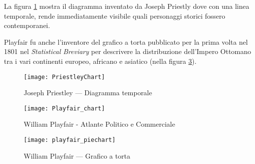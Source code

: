 La figura \ref{fig:diagramma_temporale} mostra il diagramma inventato da Joseph Priestly dove con una linea temporale, rende immediatamente visibile quali personaggi storici fossero contemporanei.

Playfair fu anche l’inventore del grafico a torta pubblicato per la prima volta nel 1801 nel \emph{Statistical Breviary} per descrivere la distribuzione dell’Impero Ottomano tra i vari continenti europeo, africano e asiatico (nella figura \ref{fig:playfair_grafico_torta}).

\begin{figure}[htp]
    \centering
    \texttt{[image: PriestleyChart]}
    \caption{Joseph Priestley — Diagramma temporale}
    \label{fig:diagramma_temporale}
\end{figure}

\begin{figure}[htp]
    \centering
    \texttt{[image: Playfair\_chart]}
    \caption{William Playfair - Atlante Politico e Commerciale}
    \label{fig:atlante_politico_commerciale}
\end{figure}

\begin{figure}[htp]
    \centering
    \texttt{[image: playfair\_piechart]}
    \caption{William Playfair — Grafico a torta}
    \label{fig:playfair_grafico_torta}
\end{figure}